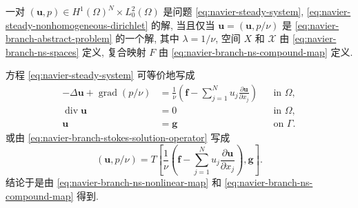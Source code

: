 \setcounter{statement}{0}
\begin{Lemma}\label{lem:navier-branch-ns-equivalence}
一对 $(\mathbf u,p)\in H^1(\Omega)^N\times L_0^2(\Omega)$ 是问题
\eqref{eq:navier-steady-system},
\eqref{eq:navier-steady-nonhomogeneous-dirichlet} 的解, 当且仅当
$\boldsymbol u=(\mathbf u,p/\nu)$ 是
\eqref{eq:navier-branch-abstract-problem} 的一个解, 其中
$\lambda=1/\nu$, 空间 $X$ 和 $\mathscr X$ 由
\eqref{eq:navier-branch-ns-spaces} 定义, 复合映射 $F$ 由
\eqref{eq:navier-branch-ns-compound-map} 定义.
\end{Lemma}
\begin{Proof}
方程 \eqref{eq:navier-steady-system} 可等价地写成
\[
\begin{aligned}
-\Delta\mathbf u+\operatorname{grad}(p/\nu)
&=\frac1\nu\left(\mathbf f-
\sum_{j=1}^{N}u_j\frac{\partial\mathbf u}{\partial x_j}\right)
&&\text{in }\Omega,\\
\operatorname{div}\mathbf u&=0&&\text{in }\Omega,\\
\mathbf u&=\mathbf g&&\text{on }\Gamma.
\end{aligned}
\]
或由 \eqref{eq:navier-branch-stokes-solution-operator} 写成
\[
(\mathbf u,p/\nu)
=T\left[
\frac1\nu\left(\mathbf f-
\sum_{j=1}^{N}u_j\frac{\partial\mathbf u}{\partial x_j}\right),
\mathbf g\right].
\]
结论于是由 \eqref{eq:navier-branch-ns-nonlinear-map} 和
\eqref{eq:navier-branch-ns-compound-map} 得到.
\end{Proof}

